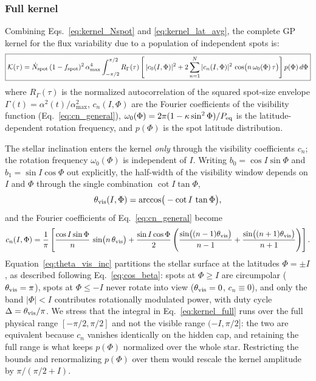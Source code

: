 \documentclass[preprint]{aastex702}
\begin{document}
\subsubsection{Full kernel} \label{subsec:kernel_full}

Combining Eqs.~\eqref{eq:kernel_Nspot} and \eqref{eq:kernel_lat_avg}, the complete GP kernel for the flux variability due to a population of independent spots is:
\begin{equation}
    \boxed{
    \mathcal{K}(\tau) = \dot{N}_{\rm spot}\,(1 - f_{\rm spot})^2\,\alpha_{\max}^4
    \int_{-\pi/2}^{\pi/2} R_\Gamma(\tau) \left[\, |c_0(I,\Phi)|^2 + 2\sum_{n=1}^{N} |c_n(I,\Phi)|^2\, \cos\!\big(n\,\omega_0(\Phi)\,\tau\big) \right] p(\Phi)\, d\Phi
    }
    \label{eq:kernel_full}
\end{equation}
where $R_\Gamma(\tau)$ is the normalized autocorrelation of the squared spot-size envelope $\Gamma(t) = \alpha^2(t)/\alpha_{\max}^2$, $c_n(I,\Phi)$ are the Fourier coefficients of the visibility function (Eq.~\ref{eq:cn_general}), $\omega_0(\Phi) = 2\pi(1 - \kappa\sin^2\Phi)/P_{\rm eq}$ is the latitude-dependent rotation frequency, and $p(\Phi)$ is the spot latitude distribution.

The stellar inclination enters the kernel \emph{only} through the visibility coefficients $c_n$; the rotation frequency $\omega_0(\Phi)$ is independent of $I$. Writing $b_0 = \cos I \sin\Phi$ and $b_1 = \sin I \cos\Phi$ out explicitly, the half-width of the visibility window depends on $I$ and $\Phi$ through the single combination $\cot I \tan\Phi$,
\begin{equation}
    \theta_{\rm vis}(I,\Phi) = \arccos\!\big(-\cot I\,\tan\Phi\big),
    \label{eq:theta_vis_inc}
\end{equation}
and the Fourier coefficients of Eq.~\eqref{eq:cn_general} become
\begin{equation}
    c_n(I,\Phi) = \frac{1}{\pi}\left[
        \frac{\cos I\sin\Phi}{n}\,\sin\!\big(n\,\theta_{\rm vis}\big)
        + \frac{\sin I\cos\Phi}{2}\left(
            \frac{\sin\!\big((n-1)\theta_{\rm vis}\big)}{n-1}
          + \frac{\sin\!\big((n+1)\theta_{\rm vis}\big)}{n+1}
        \right)\right].
    \label{eq:cn_inc}
\end{equation}
Equation~\eqref{eq:theta_vis_inc} partitions the stellar surface at the latitudes $\Phi = \pm I$, as described following Eq.~\eqref{eq:cos_beta}: spots at $\Phi \geq I$ are circumpolar ($\theta_{\rm vis} = \pi$), spots at $\Phi \leq -I$ never rotate into view ($\theta_{\rm vis} = 0$, $c_n \equiv 0$), and only the band $|\Phi| < I$ contributes rotationally modulated power, with duty cycle $\Delta = \theta_{\rm vis}/\pi$. We stress that the integral in Eq.~\eqref{eq:kernel_full} runs over the full physical range $[-\pi/2, \pi/2]$ and not the visible range $(-I, \pi/2]$: the two are equivalent because $c_n$ vanishes identically on the hidden cap, and retaining the full range is what keeps $p(\Phi)$ normalized over the whole star. Restricting the bounds and renormalizing $p(\Phi)$ over them would rescale the kernel amplitude by $\pi/(\pi/2 + I)$.
\end{document}
